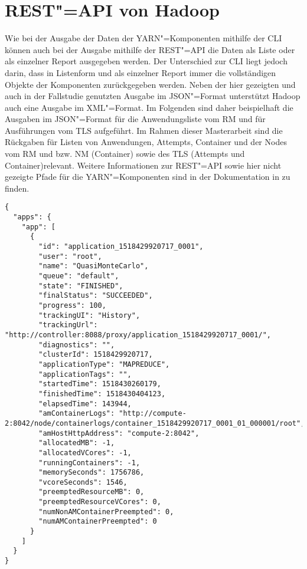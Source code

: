 \chapter{REST"=API von Hadoop}
\label{app:hadoopRestApi}

Wie bei der Ausgabe der Daten der YARN"=Komponenten mithilfe der \ac{CLI} können auch bei der Ausgabe mithilfe der REST"=API die Daten als Liste oder als einzelner Report ausgegeben werden.
Der Unterschied zur \ac{CLI} liegt jedoch darin, dass in Listenform und als einzelner Report immer die vollständigen Objekte der Komponenten zurückgegeben werden.
Neben der hier gezeigten und auch in der Fallstudie genutzten Ausgabe im JSON"=Format unterstützt Hadoop auch eine Ausgabe im XML"=Format.
Im Folgenden sind daher beispielhaft die Ausgaben im JSON"=Format für die Anwendungsliste vom \ac{RM} und für Ausführungen vom \ac{TLS} aufgeführt.
Im Rahmen dieser Masterarbeit sind die Rückgaben für Listen von Anwendungen, Attempts, Container und der Nodes vom \ac{RM} und bzw. \ac{NM} (Container) sowie des \ac{TLS} (Attempts und Container)relevant.
Weitere Informationen zur REST"=API sowie hier nicht gezeigte Pfade für die \ac{YARN}"=Komponenten sind in der Dokumentation in \cite{HadoopYarnTlServer271,HadoopRmApi271,HadoopNmApi271} zu finden.

\begin{lstlisting}[label=lst:hadoopAppListRestRm,style=json,
caption={[REST"=-Ausgabe aller Anwendungen vom \acs{RM}]
    REST"=Ausgabe aller Anwendungen vom \acs{RM}.
    Die Liste kann mithilfe verschiedener Query"=Parameter gefiltert werden.\\
    URL: \url{http://addr:port/ws/v1/cluster/apps}}]
{
  "apps": {
    "app": [
      {
        "id": "application_1518429920717_0001",
        "user": "root",
        "name": "QuasiMonteCarlo",
        "queue": "default",
        "state": "FINISHED",
        "finalStatus": "SUCCEEDED",
        "progress": 100,
        "trackingUI": "History",
        "trackingUrl": "http://controller:8088/proxy/application_1518429920717_0001/",
        "diagnostics": "",
        "clusterId": 1518429920717,
        "applicationType": "MAPREDUCE",
        "applicationTags": "",
        "startedTime": 1518430260179,
        "finishedTime": 1518430404123,
        "elapsedTime": 143944,
        "amContainerLogs": "http://compute-2:8042/node/containerlogs/container_1518429920717_0001_01_000001/root",
        "amHostHttpAddress": "compute-2:8042",
        "allocatedMB": -1,
        "allocatedVCores": -1,
        "runningContainers": -1,
        "memorySeconds": 1756786,
        "vcoreSeconds": 1546,
        "preemptedResourceMB": 0,
        "preemptedResourceVCores": 0,
        "numNonAMContainerPreempted": 0,
        "numAMContainerPreempted": 0
      }
    ]
  }
}
\end{lstlisting}


